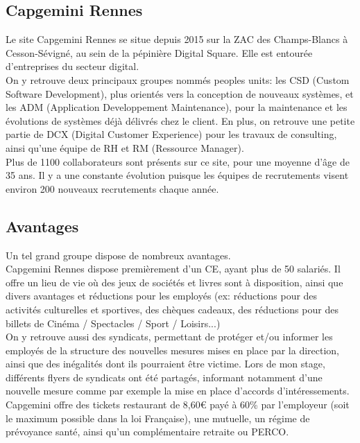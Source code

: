 \documentclass{rapport}
\begin{document}
\subsection{Capgemini Rennes}

Le site Capgemini Rennes se situe depuis 2015 sur la ZAC des Champs-Blancs à Cesson-Sévigné, au sein de la pépinière Digital Square. Elle est entourée d'entreprises du secteur digital. \\

On y retrouve deux principaux groupes nommés peoples units: les CSD (Custom Software Development), plus orientés vers la conception de nouveaux systèmes, et les ADM (Application Developpement Maintenance), pour la maintenance et les évolutions de systèmes déjà délivrés chez le client. En plus, on retrouve une petite partie de DCX (Digital Customer Experience) pour les travaux de consulting, ainsi qu'une équipe de RH et RM (Ressource Manager).\\

Plus de 1100 collaborateurs sont présents sur ce site, pour une moyenne d'âge de 35 ans. Il y a une constante évolution puisque les équipes de recrutements visent environ 200 nouveaux recrutements chaque année. 

\subsection{Avantages}
Un tel grand groupe dispose de nombreux avantages.\\

Capgemini Rennes dispose premièrement d'un CE, ayant plus de 50 salariés. Il offre un lieu de vie où des jeux de sociétés et livres sont à disposition, ainsi que divers avantages et réductions pour les employés (ex: réductions pour des activités culturelles et sportives, des chèques cadeaux, des réductions pour des billets de Cinéma / Spectacles / Sport / Loisirs...)\\

On y retrouve aussi des syndicats, permettant de protéger et/ou informer les employés de la structure des nouvelles mesures mises en place par la direction, ainsi que des inégalités dont ils pourraient être victime. Lors de mon stage,  différents flyers de syndicats ont été partagés, informant notamment d'une nouvelle mesure comme par exemple la mise en place d'accords d'intéressements.\\

Capgemini offre des tickets restaurant de 8,60€ payé à 60\% par l'employeur (soit le maximum possible dans la loi Française), une mutuelle, un régime de prévoyance santé, ainsi qu'un complémentaire retraite ou PERCO.\\
\end{document}

